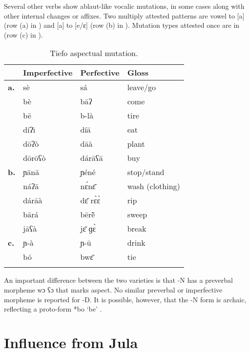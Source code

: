 \documentclass[output=paper,
modfonts
]{langscibook}
\begin{document}
Several other verbs show ablaut-like vocalic mutations, in some cases along with other internal changes or affixes. Two multiply attested patterns are vowel to [a] (row (a) in ) and [a] to [e/ɛ] (row (b) in ). Mutation types attested once are in (row (c) in ).

\begin{table}
\caption{Tiefo aspectual mutation.}
\label{tab:hangtan:7}
\begin{tabularx}{\textwidth}{lXXX}
\lsptoprule
 & {\bfseries Imperfective} & {\bfseries Perfective} & {\bfseries Gloss}\\
\midrule
{\bfseries a.} & { sè} & { sá} & { leave/go}\\
& { bè} & { bāʔ} & { come}\\
& { bē} & { b-là} & { tire}\\
& { díʔ\=\i} & { díā} & { eat}\\
& { d\=oʔò} & { dāà} & { plant}\\
& { d\=or\=oʕò} & { dárāʕā} & { buy}\\
{\bfseries b.} & { ɲānā} & { ɲéné} & { stop/stand}\\
& { náʔā} & { {n}{\'{ɛ}}{n}\={ɛ}} & { wash (clothing)}\\
& { dárāà} & { {d}\={ɛ} {r}{\`{ɛ}}{\`{ɛ}}} & { rip}\\
& { bārá} & { {bēr}\`{ẽ}} & { sweep}\\
& { jāʕà} & { {j}\={ɛ} {ɡ}{\`{ɛ}}} & { break}\\
{\bfseries c.} & { ɲ{}-à} & { ɲ{}-ū} & { drink}\\
& { bó} & { {bw}\={ɛ}} & { tie}\\
\lspbottomrule
\end{tabularx}
\end{table}

An important difference between the two  varieties is that -N has a preverbal morpheme wɔ ʕɔ that marks  aspect. No similar preverbal  or imperfective morpheme is reported for -D. It is possible, however, that the -N form is archaic, reflecting a proto-form *bo ‘be’ \citet{Manessy1982}.

\section{Influence from Jula}\label{sec:hangtan:4}
\end{document}
